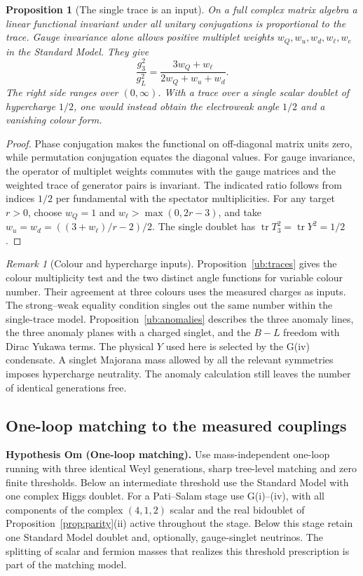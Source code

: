 \documentclass[aps,pra,onecolumn,superscriptaddress,nofootinbib,10pt]{revtex4-2}
\newtheorem{proposition}[theorem]{Proposition}
\theoremstyle{definition}
\theoremstyle{remark}
\newtheorem{remark}[theorem]{Remark}
\begin{document}
\begin{proposition}[The single trace is an input]\label{cr:weights}
On a full complex matrix algebra a linear functional invariant
under all unitary conjugations is proportional to the trace.
Gauge invariance alone allows positive multiplet weights
$w_Q,w_u,w_d,w_\ell,w_e$ in the Standard Model. They give
\[
 \frac{g_3^2}{g_L^2}
 =\frac{3w_Q+w_\ell}{2w_Q+w_u+w_d}.
\]
The right side ranges over $(0,\infty)$. With a trace over a
single scalar doublet of hypercharge $1/2$, one would instead
obtain the electroweak angle $1/2$ and a vanishing colour form.
\end{proposition}
\begin{proof}
Phase conjugation makes the functional on off-diagonal matrix
units zero, while permutation conjugation equates the diagonal
values. For gauge invariance, the operator of multiplet weights
commutes with the gauge matrices and the weighted trace of
generator pairs is invariant. The indicated ratio follows from
indices $1/2$ per fundamental with the spectator multiplicities.
For any target $r>0$, choose $w_Q=1$ and
$w_\ell>\max(0,2r-3)$, and take
$w_u=w_d=((3+w_\ell)/r-2)/2$. The single doublet has
$\operatorname{tr}T_3^2=\operatorname{tr}Y^2=1/2$.
\end{proof}

\begin{remark}[Colour and hypercharge inputs]\label{cr:colourinput}
Proposition~\ref{ub:traces} gives the colour multiplicity test
and the two distinct angle functions for variable colour number.
Their agreement at three colours uses the measured charges as
inputs. The strong--weak equality condition singles out the same
number within the single-trace model. Proposition~\ref{ub:anomalies}
describes the three anomaly lines, the three anomaly planes with a
charged singlet, and the $B-L$ freedom with Dirac Yukawa terms.
The physical $Y$ used here is selected by the G(iv) condensate.
A singlet Majorana mass allowed by all the relevant symmetries
imposes hypercharge neutrality. The anomaly calculation still
leaves the number of identical generations free.
\end{remark}

\subsection{One-loop matching to the measured couplings}

\smallskip\noindent\textbf{Hypothesis Om (One-loop matching).}  Use mass-independent one-loop running with three identical Weyl
generations, sharp tree-level matching and zero finite thresholds.
Below an intermediate threshold use the Standard Model with one
complex Higgs doublet. For a Pati--Salam stage use G(i)--(iv), with
all components of the complex $(4,1,2)$ scalar and the real
bidoublet of Proposition~\ref{prop:parity}(ii) active throughout
the stage. Below this stage retain one Standard Model doublet
and, optionally, gauge-singlet neutrinos. The splitting of scalar
and fermion masses that realizes this threshold prescription is
part of the matching model.
\end{document}
